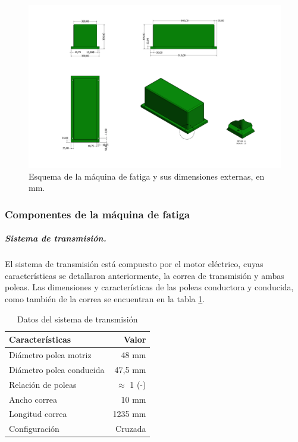 \begin{figure}[h]
\centering
\includegraphics[width=1\linewidth, trim={10cm 37cm 17cm 2cm},clip]{Imagenes/MaqFatiga-1.pdf}
\caption{Esquema de la máquina de fatiga y sus dimensiones externas, en mm.}
\label{fig:diag_maqfat}
\end{figure}

\subsubsection{Componentes de la máquina de fatiga}
\subparagraph{Sistema de transmisión.}
El sistema de transmisión está compuesto por el motor eléctrico, cuyas características se detallaron anteriormente, la correa de transmisión y ambas poleas. Las dimensiones y características de las poleas conductora y conducida, como también de la correa se encuentran en la tabla \ref{tab:sist_transmision}. 

\begin{table}[h]
\centering
\begin{tabular}{@{}lr@{}}
\toprule
Características          & Valor   			\\ \midrule
Diámetro polea motriz    & 48 mm   			\\
Diámetro polea conducida & 47,5 mm 			\\
Relación de poleas		 & $\approx$ 1 (-) 	\\
Ancho correa             & 10 mm   			\\
Longitud correa          & 1235 mm 			\\
Configuración            & Cruzada 			\\ \bottomrule
\end{tabular}
\caption{Datos del sistema de transmisión}
\label{tab:sist_transmision}
\end{table}

